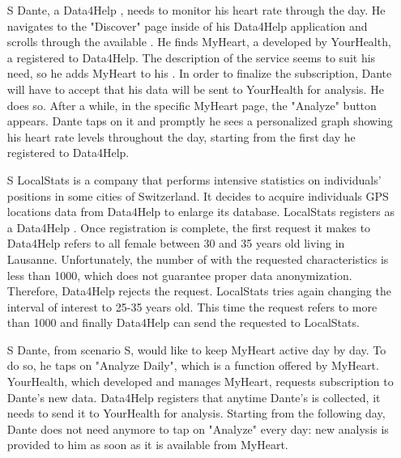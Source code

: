 \documentclass[../../rasd.tex]{subfiles}
\begin{document}
\begin{itemize}
                    \item[S\subs{3}] Dante, a Data4Help , needs to monitor his heart rate through the day. He navigates to the "Discover" page inside of his Data4Help application and scrolls through the available . He finds MyHeart, a  developed by YourHealth, a  registered to Data4Help. The description of the service seems to suit his need, so he adds MyHeart to his . In order to finalize the subscription, Dante will have to accept that his data will be sent to YourHealth for analysis. He does so. After a while, in the specific MyHeart  page, the "Analyze" button appears. Dante taps on it and promptly he sees a personalized graph showing his heart rate levels throughout the day, starting from the first day he registered to Data4Help.

                    \item[S\subs{4}] LocalStats is a company that performs intensive statistics on individuals' positions in some cities of Switzerland. It decides to acquire individuals GPS locations data from Data4Help to enlarge its database. LocalStats registers as a Data4Help . Once registration is complete, the first request it makes to Data4Help refers to all female  between 30 and 35 years old living in Lausanne. Unfortunately, the number of  with the requested characteristics is less than 1000, which does not guarantee proper data anonymization. Therefore, Data4Help rejects the  request. LocalStats tries again changing the interval of interest to 25-35 years old. This time the request refers to more than 1000  and finally Data4Help can send the requested  to LocalStats.

                    \item[S\subs{5}] Dante, from scenario S, would like to keep MyHeart active day by day. To do so, he taps on "Analyze Daily", which is a function offered by MyHeart. YourHealth, which developed and manages MyHeart, requests subscription to Dante's new data. Data4Help registers that anytime Dante's  is collected, it needs to send it to YourHealth for analysis. Starting from the following day, Dante does not need anymore to tap on "Analyze" every day: new analysis is provided to him as soon as it is available from MyHeart.


\end{itemize}
\end{document}
